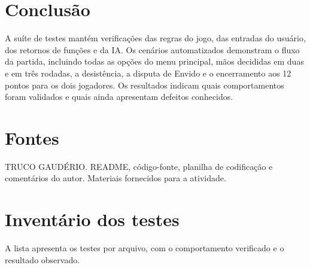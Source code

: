 \documentclass[11pt,a4paper]{article}
\begin{document}
\section{Conclusão}

A suíte de testes mantém verificações das regras do jogo, das entradas do usuário, dos retornos de funções e da IA. Os cenários automatizados demonstram o fluxo da partida, incluindo todas as opções do menu principal, mãos decididas em duas e em três rodadas, a desistência, a disputa de Envido e o encerramento aos 12 pontos para os dois jogadores. Os resultados indicam quais comportamentos foram validados e quais ainda apresentam defeitos conhecidos.

\section*{Fontes}

TRUCO GAUDÉRIO. README, código-fonte, planilha de codificação e comentários do autor. Materiais fornecidos para a atividade.

\section*{Inventário dos testes}

A lista apresenta os testes por arquivo, com o comportamento verificado e o resultado observado.
\end{document}
